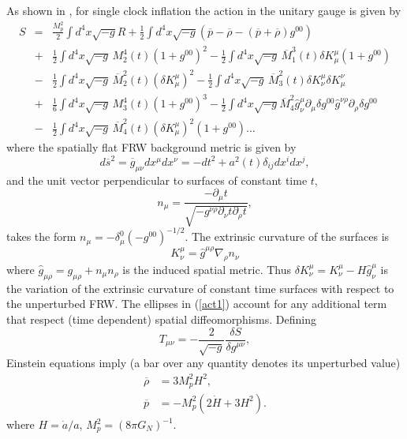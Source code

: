 \documentclass[11pt,amsmath,floats,floatfix,nofootinbib,secnumarabic, superscriptaddress, tightenlines]{revtex4}
\newcommand{\beq}{\begin{equation}}
\newcommand{\eeq}{\end{equation}}
\begin{document}
{As shown in \cite{eft1}, for single clock inflation the action in the unitary gauge is given by
\begin{eqnarray}
\label{act1}
S&=&\frac{M_p^2}{2}\int d^4 x\sqrt{-g} R+\frac{1}{2}\int d^4 x \sqrt{-g}(\overline{p}-\overline{\rho}-(\overline{p}+\overline{\rho}) g^{00})\nonumber\\
&+&\frac{1}{2} \int d^4 x \sqrt{-g}\,M_2^4(t) (1+ g^{00})^2-\frac{1}{2}\int d^4 x \sqrt{-g}\,\overline{M}_1^3(t)\delta K_{\mu}^{\mu}(1+ g^{00})\nonumber\\
&-&\frac{1}{2}\int d^4 x \sqrt{-g}\,\overline{M}_2^2(t) (\delta K_{\mu}^{\mu})^2-\frac{1}{2}\int d^4 x \sqrt{-g}\,\overline{M}_3^2(t) \delta K^{\mu}_{\nu}\delta K^{\nu}_{\mu}\nonumber\\
&+&\frac{1}{6}\int d^4 x \sqrt{-g}\,{M}_3^4(t) (1+ g^{00})^3-\frac{1}{2}\int d^4x \sqrt{-g} \overline{M}^2_4 \hat{g}^{\mu}_{\nu}\partial_{\mu} \delta g^{00} \hat{g}^{\nu\rho}\partial_{\rho} \delta g^{00}\nonumber\\
&-&\frac{1}{2}\int d^4 x \sqrt{-g}\,\overline{M}_4^2(t)(\delta K_{\mu}^{\mu})^2(1+ g^{00})\ldots\label{action}
\end{eqnarray} where the spatially flat FRW background metric is given by
\beq d\overline{s}^2=\overline{g}_{\mu\nu}dx^{\mu}dx^{\nu}=-dt^2+a^2(t)\delta_{ij}dx^idx^j,
\eeq
and the unit vector perpendicular to surfaces of constant time  ${t}$,
\beq \label{nmu} n_{\mu}=\frac{-\partial_{\mu}{t}}{\sqrt{-g^{\nu\rho}\partial_{\nu}{t}\partial_{\rho}{t}}},
\eeq
takes the form $ n_{\mu}=-\delta^{0}_{\mu} (-g^{00})^{-1/2}$. The  extrinsic curvature of the surfaces is
 \beq
K^{\mu}_{\nu}=\hat{g}^{\mu\rho}\nabla_{\rho}n_{\nu}\eeq
where  $\hat{g}_{\mu\rho}=g_{\mu\rho}+n_{\mu}n_{\rho}$ is the induced spatial metric. Thus $\delta K^{\mu}_{\nu}=K^{\mu}_{\nu}- H \hat{g}^{\mu}_{\nu}$ is the variation of the extrinsic curvature of constant time surfaces with respect to the unperturbed FRW. The ellipses in (\ref{act1}) account for any additional term that respect (time dependent) spatial diffeomorphisms. Defining
\beq T_{\mu\nu}=-\frac{2}{\sqrt{-g}}\frac{\delta S}{\delta{g^{\mu\nu}}},
\eeq
Einstein equations imply (a bar over any quantity denotes its unperturbed value)
\begin{subequations}
\begin{align}
\label{tadsuba}
\overline{\rho}&=3M_p^2 H^2,\\
\label{tadsubb}
\overline{p}&=-M_p^2 (2\dot{H}+3 H^2).
\end{align}
\end{subequations}where $H=\dot{a}/a$, $M_{p}^2=(8\pi G_N)^{-1}$.\\

}
\end{document}
